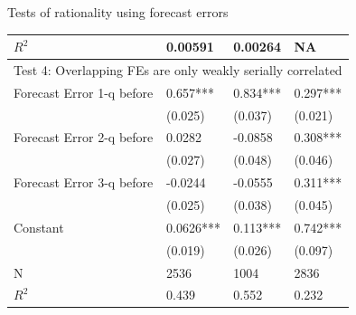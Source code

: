 \documentclass{beamer}
\begin{document}
\begin{frame}{Tests of rationality using forecast errors}
\begin{adjustbox}{totalheight=0.9\textheight}
\begin{tabular}{llll}
		$R^2$                   & 0.00591          & 0.00264          & NA             \\
		\hline 
		\multicolumn{4}{l}{Test 4: Overlapping FEs are only weakly serially correlated}                          \\
		\hline 
		Forecast Error 1-q before           & 0.657***         & 0.834***         & 0.297***       \\
		& (0.025)          & (0.037)          & (0.021)        \\
		Forecast Error 2-q before           & 0.0282           & -0.0858          & 0.308***       \\
		& (0.027)          & (0.048)          & (0.046)        \\
		Forecast Error 3-q before           & -0.0244          & -0.0555          & 0.311***       \\
		& (0.025)          & (0.038)          & (0.045)        \\
		Constant                            & 0.0626***        & 0.113***         & 0.742***       \\
		& (0.019)          & (0.026)          & (0.097)        \\
		\hline 
		N                                   & 2536             & 1004             & 2836           \\
		$R^2$                & 0.439            & 0.552            & 0.232    \\
		\hline      
	\end{tabular}
\end{adjustbox}

\end{frame}
\end{document}
